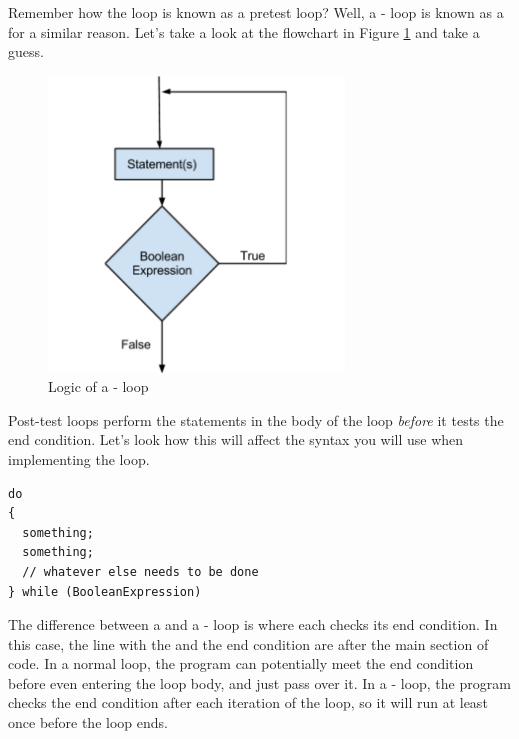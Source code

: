 
Remember how the  loop is known as a pretest loop?
Well, a - loop is known as a  for a similar reason.
Let's take a look at the flowchart in Figure \ref{fig-do-while-logic} and take a guess.

\begin{figure}[tbh]
  \centering
  \includegraphics[width=0.7\textwidth]{diagrams/do_while_logic.pdf}
  \caption{Logic of a - loop} \label{fig-do-while-logic} 
\end{figure}

Post-test loops perform the statements in the body of the loop \emph{before} it tests the end condition.
Let's look how this will affect the syntax you will use when implementing the loop.

\noindent\begin{minipage}{\linewidth}\begin{lstlisting}
do
{
  something;
  something;
  // whatever else needs to be done
} while (BooleanExpression)
\end{lstlisting}\end{minipage}

The difference between a  and a - loop is where each checks its end condition.
In this case, the line with the  and the end condition are after the main section of code.
In a normal  loop, the program can potentially meet the end condition before even entering the loop body, and just pass over it.
In a - loop, the program checks the end condition after each iteration of the loop, so it will run at least once before the loop ends.

